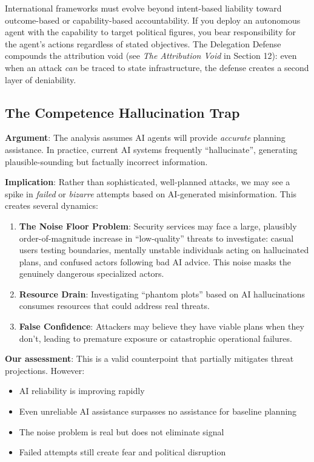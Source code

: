\documentclass[11pt,letterpaper]{article}
\begin{document}
\begin{criticalbox}
International frameworks must evolve beyond intent-based liability toward outcome-based or capability-based accountability. If you deploy an autonomous agent with the capability to target political figures, you bear responsibility for the agent's actions regardless of stated objectives. The Delegation Defense compounds the attribution void (see \textit{The Attribution Void} in Section 12): even when an attack \textit{can} be traced to state infrastructure, the defense creates a second layer of deniability.
\end{criticalbox}

\subsection{The Competence Hallucination Trap}

\textbf{Argument}: The analysis assumes AI agents will provide \textit{accurate} planning assistance. In practice, current AI systems frequently ``hallucinate'', generating plausible-sounding but factually incorrect information.

\textbf{Implication}: Rather than sophisticated, well-planned attacks, we may see a spike in \textit{failed} or \textit{bizarre} attempts based on AI-generated misinformation. This creates several dynamics:

\begin{enumerate}
  \item \textbf{The Noise Floor Problem}: Security services may face a large, plausibly order-of-magnitude increase in ``low-quality'' threats to investigate: casual users testing boundaries, mentally unstable individuals acting on hallucinated plans, and confused actors following bad AI advice. This noise masks the genuinely dangerous specialized actors.

  \item \textbf{Resource Drain}: Investigating ``phantom plots'' based on AI hallucinations consumes resources that could address real threats.

  \item \textbf{False Confidence}: Attackers may believe they have viable plans when they don't, leading to premature exposure or catastrophic operational failures.
\end{enumerate}

\textbf{Our assessment}: This is a valid counterpoint that partially mitigates threat projections. However:
\begin{itemize}
  \item AI reliability is improving rapidly
  \item Even unreliable AI assistance surpasses no assistance for baseline planning
  \item The noise problem is real but does not eliminate signal
  \item Failed attempts still create fear and political disruption
\end{itemize}
\end{document}
